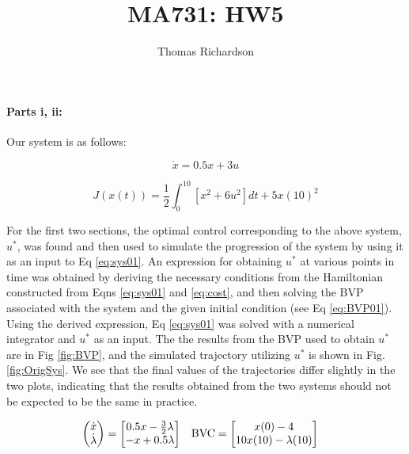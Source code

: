 \documentclass[12pt, notitlepage, letterpaper]{article}
\title{MA731: HW5}
\author{Thomas Richardson}
{\large }
\begin{document}

\baselineskip 24pt


\maketitle

\noindent

\paragraph{Parts i, ii:}

Our system is as follows:

\begin{equation}
\label{eq:sys01}
\dot{x} = 0.5x + 3u
\end{equation}

\begin{equation}
\label{eq:cost}
J(x(t)) = \frac{1}{2}\int_{0}^{10}[x^2 + 6u^2] dt  + 5x(10)^2
\end{equation}

\noindent For the first two sections, the optimal control corresponding to the above system, $u^*$, was found and then used to simulate the progression of the system by using it as an input to Eq \ref{eq:sys01}.  An expression for obtaining $u^*$ at various points in time was obtained by deriving the necessary conditions from the Hamiltonian constructed from Eqns \ref{eq:sys01} and \ref{eq:cost}, and then solving the BVP associated with the system and the given initial condition (see Eq \ref{eq:BVP01}).  Using the derived expression,  Eq \ref{eq:sys01} was solved with a numerical integrator and $u^*$ as an input.  The the results from the BVP used to obtain $u^*$ are in Fig \ref{fig:BVP}, and the simulated trajectory utilizing $u^*$ is shown in Fig. \ref{fig:OrigSys}.  We see that the final values of the trajectories differ slightly in the two plots, indicating that the results obtained from the two systems should not be expected to be the same in practice.

\begin{align}
\label{eq:BVP01}
\begin{pmatrix}
\dot{x} \\
\dot{\lambda}
\end{pmatrix}
&=
\begin{bmatrix}
0.5x - \frac{3}{2}\lambda \\
-x + 0.5\lambda
\end{bmatrix}
&
\hfill \text{BVC}
&=
\begin{bmatrix}
x(0) - 4 \\
10x(10) - \lambda(10)
\end{bmatrix}
\end{align}
\end{document}
